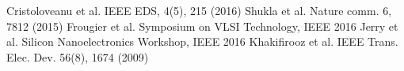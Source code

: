 \setlength{\multicolsep}{0em}
\begin{multicols}{2}
{\fontsize{9pt}{9pt}\selectfont

\frenchspacing

\renewcommand{\section}[2]{}
\begin{thebibliography}{9} 

Cristoloveanu et al.  IEEE EDS, 4(5), 215 (2016)
Shukla et al. Nature comm. 6, 7812 (2015)
Frougier et al. Symposium on VLSI Technology, IEEE 2016
Jerry et al. Silicon Nanoelectronics Workshop, IEEE 2016
Khakifirooz et al.  IEEE Trans. Elec. Dev. 56(8), 1674 (2009)

\end{thebibliography}
}
\end{multicols}

\pagebreak





